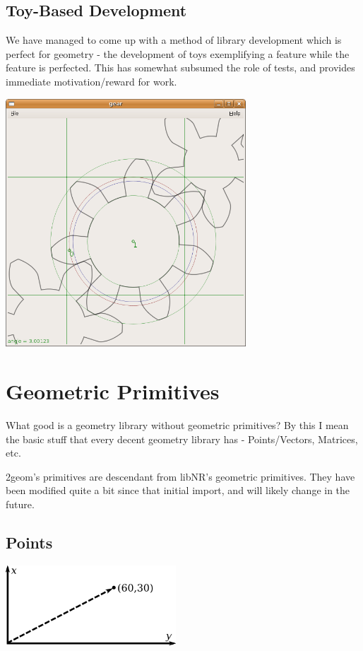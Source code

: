 \documentclass[openany]{book}
\begin{document}
\section{Toy-Based Development}
We have managed to come up with a method of library development
which is perfect for geometry - the development of toys exemplifying
a feature while the feature is perfected.  This has somewhat subsumed
the role of tests, and provides immediate motivation/reward for work.

\includegraphics[width=90mm]{media/gear.png}

\chapter{Geometric Primitives}

What good is a geometry library without geometric primitives?  By this
I mean the basic stuff that every decent geometry library has -
Points/Vectors, Matrices, etc.

2geom's primitives are descendant from libNR's geometric primitives.
They have been modified quite a bit since that initial import, and
will likely change in the future.

\section{Points}

\includegraphics[height=30mm]{media/point.png}
\end{document}
